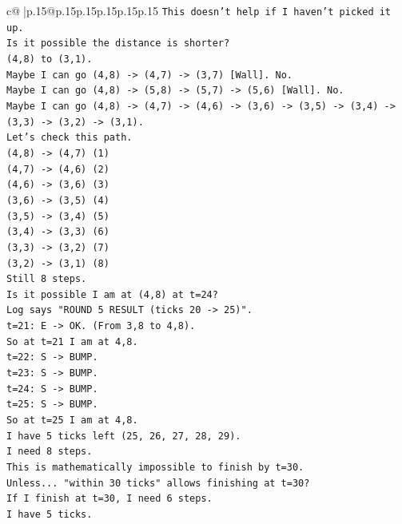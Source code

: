 \documentclass{article}
\begin{document}
{\begin{supertabular}{c@{$\;$}|p{.15\linewidth}@{}p{.15\linewidth}p{.15\linewidth}p{.15\linewidth}p{.15\linewidth}p{.15\linewidth}}
{{{\texttt{This doesn't help if I haven't picked it up.} \\
\texttt{Is it possible the distance is shorter?} \\
\texttt{(4,8) to (3,1).} \\
\texttt{Maybe I can go (4,8) {-}> (4,7) {-}> (3,7) {[}Wall{]}. No.} \\
\texttt{Maybe I can go (4,8) {-}> (5,8) {-}> (5,7) {-}> (5,6) {[}Wall{]}. No.} \\
\texttt{Maybe I can go (4,8) {-}> (4,7) {-}> (4,6) {-}> (3,6) {-}> (3,5) {-}> (3,4) {-}> (3,3) {-}> (3,2) {-}> (3,1).} \\
\texttt{Let's check this path.} \\
\texttt{(4,8) {-}> (4,7) (1)} \\
\texttt{(4,7) {-}> (4,6) (2)} \\
\texttt{(4,6) {-}> (3,6) (3)} \\
\texttt{(3,6) {-}> (3,5) (4)} \\
\texttt{(3,5) {-}> (3,4) (5)} \\
\texttt{(3,4) {-}> (3,3) (6)} \\
\texttt{(3,3) {-}> (3,2) (7)} \\
\texttt{(3,2) {-}> (3,1) (8)} \\
\texttt{Still 8 steps.} \\
\texttt{Is it possible I am at (4,8) at t=24?} \\
\texttt{Log says "ROUND 5 RESULT (ticks 20 {-}> 25)".} \\
\texttt{t=21: E {-}> OK. (From 3,8 to 4,8).} \\
\texttt{So at t=21 I am at 4,8.} \\
\texttt{t=22: S {-}> BUMP.} \\
\texttt{t=23: S {-}> BUMP.} \\
\texttt{t=24: S {-}> BUMP.} \\
\texttt{t=25: S {-}> BUMP.} \\
\texttt{So at t=25 I am at 4,8.} \\
\texttt{I have 5 ticks left (25, 26, 27, 28, 29).} \\
\texttt{I need 8 steps.} \\
\texttt{This is mathematically impossible to finish by t=30.} \\
\texttt{Unless... "within 30 ticks" allows finishing at t=30?} \\
\texttt{If I finish at t=30, I need 6 steps.} \\
\texttt{I have 5 ticks.} \\
}}}
\end{supertabular}}
\end{document}
